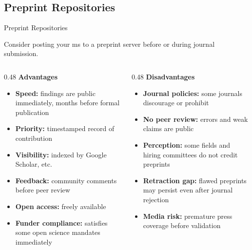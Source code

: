 \documentclass{beamer}
\begin{document}

\subsection{Preprint Repositories}


\begin{frame}{Preprint Repositories}

  \footnotesize

  Consider posting your ms to a preprint server before or during journal submission.

   \smallskip


  \begin{columns}[T]

    \begin{column}{0.48\textwidth}
      \textbf{Advantages}
      \smallskip
      \begin{itemize}
        \item \textbf{Speed:} findings are public immediately,
          months before formal publication
        \item \textbf{Priority:} timestamped record of contribution
        \item \textbf{Visibility:} indexed by Google Scholar, etc.
        \item \textbf{Feedback:} community comments before peer review
        \item \textbf{Open access:} freely available
        \item \textbf{Funder compliance:} satisfies some open
          science mandates immediately
      \end{itemize}
    \end{column}

    \begin{column}{0.48\textwidth}
      \textbf{Disadvantages}
      \smallskip
      \begin{itemize}
        \item \textbf{Journal policies:} some journals
          discourage or prohibit
        \item \textbf{No peer review:} errors and weak claims
          are public
        \item \textbf{Perception:} some fields and hiring
          committees do not credit preprints
        \item \textbf{Retraction gap:} flawed preprints may
          persist even after journal rejection
        \item \textbf{Media risk:} premature press coverage
          before validation
      \end{itemize}
    \end{column}

  \end{columns}

\end{frame}
\end{document}
